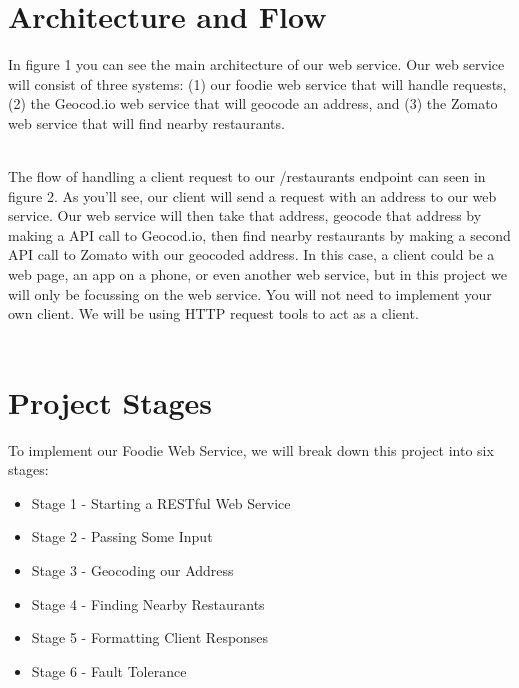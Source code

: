 \documentclass{article}
\begin{document}
\section*{Architecture and Flow}
In figure 1 you can see the main architecture of our web service. Our web service will consist of three systems: (1) our foodie web service that will handle requests, (2) the Geocod.io web service that will geocode an address, and (3) the Zomato web service that will find nearby restaurants.


\-\ \\
The flow of handling a client request to our /restaurants endpoint can seen in figure 2. As you'll see, our client will send a request with an address to our web service. Our web service will then take that address, geocode that address by making a API call to Geocod.io, then find nearby restaurants by making a second API call to Zomato with our geocoded address. In this case, a client could be a web page, an app on a phone, or even another web service, but in this project we will only be focussing on the web service. You will not need to implement your own client. We will be using HTTP request tools to act as a client.  \\\\







\section*{Project Stages} %

To implement our Foodie Web Service, we will break down this project into six stages:
\begin{itemize}  
\item Stage 1 - Starting a RESTful Web Service
\item Stage 2 - Passing Some Input
\item Stage 3 - Geocoding our Address
\item Stage 4 - Finding Nearby Restaurants
\item Stage 5 - Formatting Client Responses
\item Stage 6 - Fault Tolerance
\end{itemize}
\end{document}
